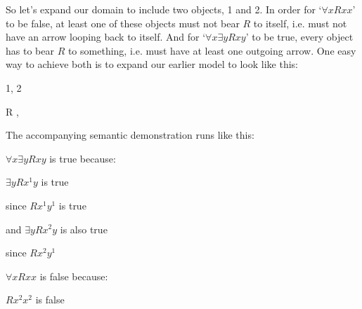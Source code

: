 So let's expand our domain to include two objects, 1 and 2.  In order for `$\forall xRxx$' to be false, at least one of these objects must not bear $R$ to itself, i.e. must not have an arrow looping back to itself.  And for `$\forall x\exists yRxy$' to be true, every object has to bear $R$ to something, i.e. must have at least one outgoing arrow.  One easy way to achieve both is to expand our earlier model to look like this:

\begin{center}
\begin{minipage}{0.8\textwidth}
\begin{multicols}{2}
\begin{ekey}
	\item[\text{Domain}] 1, 2
	\item[R] , 
\end{ekey}
\columnbreak
{}
\end{multicols}\end{minipage}\end{center}
The accompanying semantic demonstration runs like this:

\begin{ebullet}
\item $\forall x \exists y Rxy$ is true because:
\begin{etriangle}
\item $\exists yRx^1y$ is true
\begin{etriangle}
\item since $Rx^1y^1$ is true
\end{etriangle}
\item and $\exists yRx^2y$ is also true
\begin{etriangle}
\item since $Rx^2y^1$
\end{etriangle}
\end{etriangle}
\end{ebullet}

\begin{ebullet}
\item $\forall xRxx$ is false because:
\begin{etriangle}
\item $Rx^2x^2$ is false
\end{etriangle}
\end{ebullet}

